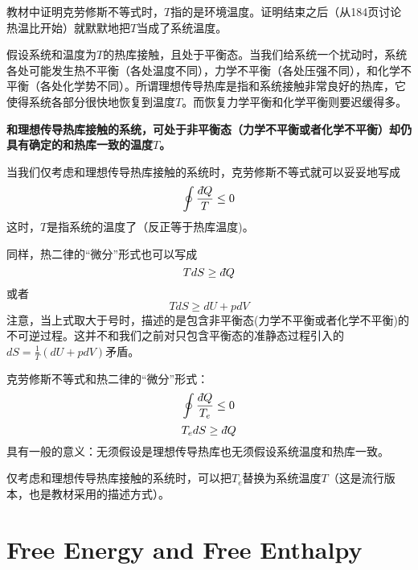 \documentclass[CJK]{beamer}
\begin{document}
\begin{frame}
\bch
教材中证明克劳修斯不等式时，$T$指的是环境温度。证明结束之后（从184页讨论热温比开始）就默默地把$T$当成了系统温度。


\ech
\end{frame}

\begin{frame}
\bch
假设系统和温度为$T$的热库接触，且处于平衡态。当我们给系统一个扰动时，系统各处可能发生热不平衡（各处温度不同），力学不平衡（各处压强不同），和化学不平衡（各处化学势不同）。所谓理想传导热库是指和系统接触非常良好的热库，它使得系统各部分很快地恢复到温度$T$。而恢复力学平衡和化学平衡则要迟缓得多。

\emini
{}
{\bf 和理想传导热库接触的系统，可处于非平衡态（力学不平衡或者化学不平衡）却仍具有确定的和热库一致的温度$T$。}
\emini
\ech
\end{frame}

\begin{frame}
\bch
当我们{\blue 仅考虑和理想传导热库接触的系统}时，克劳修斯不等式就可以妥妥地写成
{\blue $$\oint \frac{\dbar Q}{T} \le 0 $$}
这时，$T$是指系统的温度了（反正等于热库温度\wulian)。

同样，热二律的“微分”形式也可以写成{\blue
$$ TdS \ge \dbar Q $$}
或者{\blue
$$ TdS \ge dU + pdV $$}
{\small 注意，当上式取大于号时，描述的是包含非平衡态(力学不平衡或者化学不平衡)的不可逆过程。这并不和我们之前对只包含平衡态的准静态过程引入的$ dS = \frac{1}{T}\left(dU + pdV\right)$矛盾。}

\ech
\end{frame}


\begin{frame}
\bch
克劳修斯不等式和热二律的“微分”形式：
{\blue $$\oint \frac{\dbar Q}{T_e} \le 0 $$
$$ T_edS \ge \dbar Q $$}
具有一般的意义：无须假设是理想传导热库也无须假设系统温度和热库一致。

\skipline

仅考虑和理想传导热库接触的系统时，可以把$T_e$替换为系统温度$T$（这是流行版本，也是教材采用的描述方式）。
\ech
\end{frame}


\section{Free Energy and Free Enthalpy}
\end{document}
